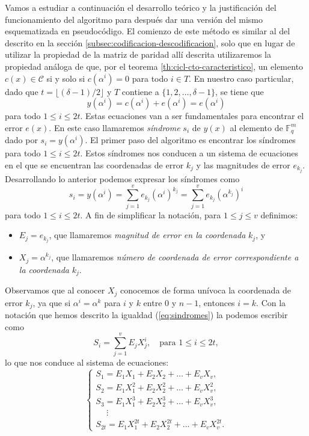 Vamos a estudiar a continuación el desarrollo teórico y la justificación del funcionamiento del algoritmo para después dar una versión del mismo esquematizada en pseudocódigo.
El comienzo de este método es similar al del descrito en la sección \ref{subsec:codificacion-descodificacion}, solo que en lugar de utilizar la propiedad de la matriz de paridad allí descrita utilizaremos la propiedad análoga de que, por el teorema \ref{th:cicl-cto-caracteristico}, un elemento \(c(x) \in \mathcal C\) si y solo si \(c(\alpha^i) = 0\) para todo \(i \in T\).
En nuestro caso particular, dado que \(t = \lfloor (\delta - 1)/2 \rfloor\) y \(T\) contiene a \(\{1, 2, \dots, \delta - 1\}\), se tiene que
\[
  y(\alpha^i) = c(\alpha^i) + e(\alpha^i) = e(\alpha^i)
\]
para todo \(1 \leq i \leq 2t\).
Estas ecuaciones van a ser fundamentales para encontrar el error \(e(x)\).
En este caso llamaremos \textit{síndrome} \(s_i\) de \(y(x)\) al elemento de \(\mathbb F_{q}^m\) dado por \(s_i = y(\alpha^i)\).
El primer paso del algoritmo es encontrar los síndromes para todo \(1 \leq i \leq 2t\).
Estos síndromes nos conducen a un sistema de ecuaciones en el que se encuentran las coordenadas de error \(k_j\) y las magnitudes de error \(e_{k_j}\).
Desarrollando lo anterior podemos expresar los síndromes como
\begin{equation}
  \label{eq:sindromes}
  s_i = y(\alpha^i) = \sum_{j = 1}^v e_{k_j}(\alpha^i)^{k_j}
   = \sum_{j = 1}^v e_{k_j}(\alpha^{k_j})^i
\end{equation}
para todo \(1 \leq i \leq 2t\).
A fin de simplificar la notación, para \(1 \leq j \leq v\) definimos: \begin{itemize}[label={—}, noitemsep, leftmargin=*]
  \item \(E_j = e_{k_j}\), que llamaremos \textit{magnitud de error en la coordenada} \(k_j\), y
  \item \(X_j = \alpha^{k_j}\), que llamaremos \textit{número de coordenada de error correspondiente a la coordenada} \(k_j\).
\end{itemize}
Observamos que al conocer \(X_j\) conocemos de forma unívoca la coordenada de error \(k_j\), ya que si \(\alpha^i = \alpha^k\) para \(i\) y \(k\) entre \(0\) y \(n-1\), entonces \(i = k\).
Con la notación que hemos descrito la igualdad (\ref{eq:sindromes}) la podemos escribir como \begin{equation}
  \label{eq:sindromes-alt}
  S_i = \sum_{j = 1}^v E_jX_{j}^i, \quad\text{para } 1 \leq i \leq 2t,
\end{equation}
lo que nos conduce al sistema de ecuaciones: \begin{equation}
  \begin{cases}
    S_1 = E_1X_1 + E_2X_2 + \dots + E_vX_v,\\
    S_2 = E_1X_1^2 + E_2X_2^2 + \dots + E_vX_v^2,\\
    S_3 = E_1X_1^3 + E_2X_2^3 + \dots + E_vX_v^3,\\
    \quad\;\vdots\\
    S_{2t} = E_1X_1^{2t} + E_2X_2^{2t} + \dots + E_vX_v^{2t}.
  \end{cases}
  \label{eq:sindromes-alt-sistema}
\end{equation}
